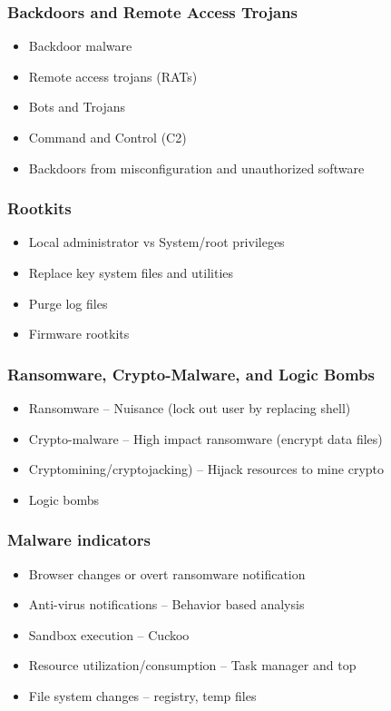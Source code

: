 		\subsubsection {Backdoors and Remote Access Trojans}
			\begin{itemize}
				\item Backdoor malware
				\item Remote access trojans (RATs)
				\item Bots and Trojans
				\item Command and Control (C2)
				\item Backdoors from misconfiguration and unauthorized software
			\end{itemize}
		\subsubsection {Rootkits}
			\begin{itemize}
				\item Local administrator vs System/root privileges
				\item Replace key system files and utilities
				\item Purge log files
				\item Firmware rootkits
			\end{itemize}
		\subsubsection {Ransomware, Crypto-Malware, and Logic Bombs}
			\begin{itemize}
				\item Ransomware -- Nuisance (lock out user by replacing shell)
				\item Crypto-malware -- High impact ransomware (encrypt data files)
				\item Cryptomining/cryptojacking) -- Hijack resources to mine crypto
				\item Logic bombs
			\end{itemize}
		\subsubsection {Malware indicators}
			\begin{itemize}
				\item Browser changes or overt ransomware notification
				\item Anti-virus notifications -- Behavior based analysis
				\item Sandbox execution -- Cuckoo
				\item Resource utilization/consumption -- Task manager and top
				\item File system changes -- registry, temp files
			\end{itemize}
